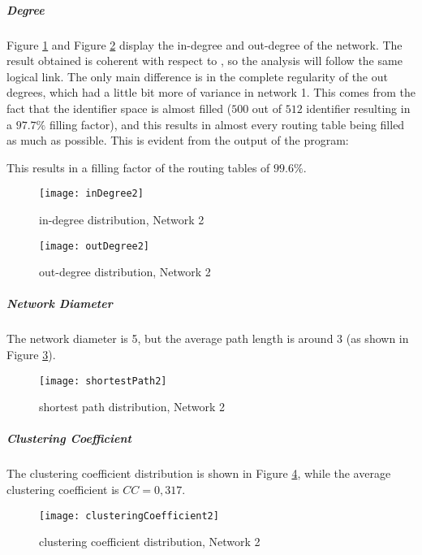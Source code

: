 \documentclass[11pt, a4paper]{report}
\begin{document}
\subparagraph*{Degree}
	Figure \ref{fig:inDegree2} and Figure \ref{fig:outDegree2} display the in-degree and out-degree of the network. The result obtained is coherent with respect to , so the analysis will follow the same logical link. The only main difference is in the complete regularity of the out degrees, which had a little bit more of variance in network 1. This comes from the fact that the identifier space is almost filled ($500$ out of $512$ identifier resulting in a $97.7\%$ filling factor), and this results in almost every routing table being filled as much as possible. This is evident from the output of the program: 
	\begin{center}
	\end{center}
	This results in a filling factor of the routing tables of $99.6\%$.
	\begin{figure}[H]
		\centering
		\texttt{[image: inDegree2]}
		\caption{in-degree distribution, Network 2}
		\label{fig:inDegree2}
	\end{figure}
	
	\begin{figure}[H]
		\centering
		\texttt{[image: outDegree2]}
		\caption{out-degree distribution, Network 2}
		\label{fig:outDegree2}
	\end{figure}

\subparagraph*{Network Diameter}
	The network diameter is 5, but the average path length is around 3 (as shown in Figure \ref{fig:shortestPath2}). 
	\begin{figure}[H]
		\centering
		\texttt{[image: shortestPath2]}
		\caption{shortest path distribution, Network 2}
		\label{fig:shortestPath2}
	\end{figure}
	
\subparagraph*{Clustering Coefficient}	
	The clustering coefficient distribution is shown in Figure \ref{fig:clusteringCoefficient2}, while the average clustering coefficient is $CC = 0,317$. 
	\begin{figure}[H]
		\centering
		\texttt{[image: clusteringCoefficient2]}
		\caption{clustering coefficient distribution, Network 2}
		\label{fig:clusteringCoefficient2}
	\end{figure}
\end{document}
